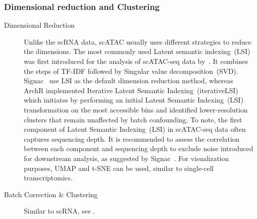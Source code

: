 \subsubsection{Dimensional reduction and Clustering}
\begin{description}
	\item[Dimensional Reduction]
	Unlike the scRNA data, scATAC usually uses different strategies to reduce the dimensions. The most commonly used Latent semantic indexing~(LSI) was first introduced for the analysis of scATAC-seq data by~\cite{cusanovich2015multiplex}. It combines the steps of TF-IDF followed by Singular value decomposition~(SVD). Signac~\citep{signac} use LSI as the default dimension reduction method, whereas ArchR implemented Iterative Latent Semantic Indexing~(iterativeLSI)~\citep{satpathy2019massively, granja2019single} which initiates by performing an initial Latent Semantic Indexing~(LSI) transformation on the most accessible bins and identified lower-resolution clusters that remain unaffected by batch confounding. To note, the first component of Latent Semantic Indexing~(LSI) in scATAC-seq data often captures sequencing depth. It is recommended to assess the correlation between each component and sequencing depth to exclude noise introduced for downstream analysis, as suggested by Signac~\citep{signac}. For visualization purposes, UMAP and t-SNE can be used, similar to single-cell transcriptomics.

	\item[Batch Correction \& Clustering]
	Similar to scRNA, see .


\end{description}
